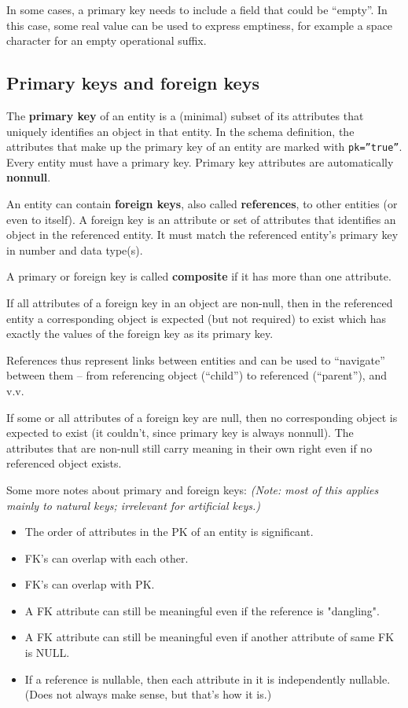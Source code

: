 \documentclass[techdoc]{nobs}   %
\begin{document}
In some cases, a primary key needs to include a field that could be
``empty''. In this case, some real value can be used to express emptiness,
for example a space character for an empty operational suffix.


\subsection{Primary keys and foreign keys}
\label{sec:Primary keys and foreign keys}

The {\bf primary key} of an entity is a (minimal) subset of its attributes
that uniquely identifies an object in that entity.
In the schema definition, the attributes that make up the primary key
of an entity are marked with {\tt pk=''true''}.
Every entity must have a primary key.
Primary key attributes are automatically {\bf nonnull}.

An entity can contain {\bf foreign keys}, also called {\bf references},
to other entities (or even to itself).
A foreign key is an attribute or set of attributes
that identifies an object in the referenced entity.
It must match the referenced entity's primary key in number and data type(s).

A primary or foreign key is called {\bf composite} if it has more than one attribute.

If all attributes of a foreign key in an object are non-null, then in
the referenced entity a corresponding object is expected (but not required) to exist
which has exactly the values of the foreign key as its primary key.

References thus represent links between entities and can be used to
``navigate'' between them -- from referencing object (``child'') to
referenced (``parent''), and v.v.

If some or all attributes of a foreign key are null, then no
corresponding object is expected to exist (it couldn't, since primary
key is always nonnull). The attributes that are non-null still carry
meaning in their own right even if no referenced object exists.

Some more notes about primary and foreign keys:
{\it (Note: most of this applies mainly to natural keys; irrelevant for artificial keys.)}
\begin{itemize}
\item The order of attributes in the PK of an entity is significant.
\item FK's can overlap with each other.
\item FK's can overlap with PK.
\item A FK attribute can still be meaningful even if the reference is "dangling".
\item A FK attribute can still be meaningful even if another attribute of same FK is NULL.
\item If a reference is nullable, then each attribute in it is independently nullable.
    (Does not always make sense, but that's how it is.)
\end{itemize}
\end{document}
